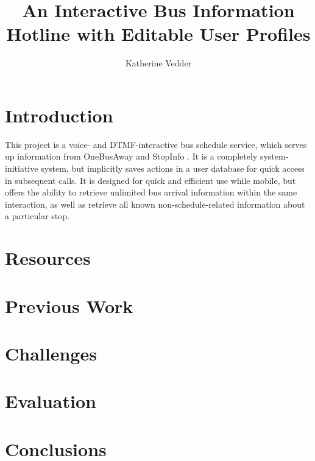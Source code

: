 \documentclass{article}
\title{An Interactive Bus Information Hotline with Editable User Profiles}
\author{Katherine Vedder}
\begin{document}
\maketitle

\section{Introduction}
This project is a voice- and DTMF-interactive bus schedule service, which serves up information from OneBusAway \cite{oba} and StopInfo \cite{stopinfo}. It is a completely system-initiative system, but implicitly saves actions in a user database for quick access in subsequent calls. It is designed for quick and efficient use while mobile, but offers the ability to retrieve unlimited bus arrival information within the same interaction, as well as retrieve all known non-schedule-related information about a particular stop.

\section{Resources}
\section{Previous Work}
\section{Challenges}
\section{Evaluation}
\section{Conclusions}




\end{document}

